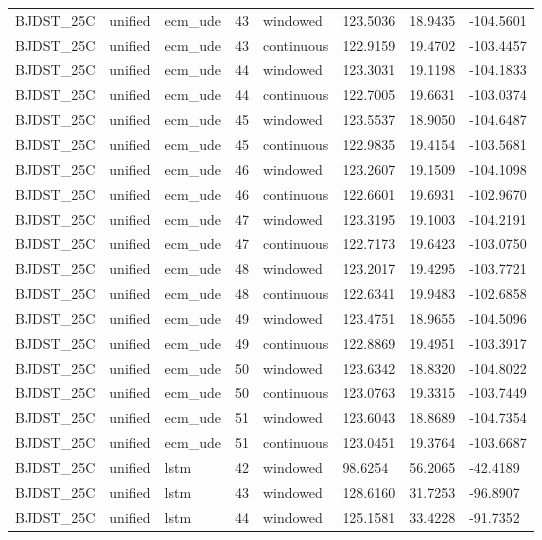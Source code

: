 \begin{tabular}{llllllll}
BJDST\_25C & unified & ecm\_ude & 43 & windowed & 123.5036 & 18.9435 & -104.5601 \\
BJDST\_25C & unified & ecm\_ude & 43 & continuous & 122.9159 & 19.4702 & -103.4457 \\
BJDST\_25C & unified & ecm\_ude & 44 & windowed & 123.3031 & 19.1198 & -104.1833 \\
BJDST\_25C & unified & ecm\_ude & 44 & continuous & 122.7005 & 19.6631 & -103.0374 \\
BJDST\_25C & unified & ecm\_ude & 45 & windowed & 123.5537 & 18.9050 & -104.6487 \\
BJDST\_25C & unified & ecm\_ude & 45 & continuous & 122.9835 & 19.4154 & -103.5681 \\
BJDST\_25C & unified & ecm\_ude & 46 & windowed & 123.2607 & 19.1509 & -104.1098 \\
BJDST\_25C & unified & ecm\_ude & 46 & continuous & 122.6601 & 19.6931 & -102.9670 \\
BJDST\_25C & unified & ecm\_ude & 47 & windowed & 123.3195 & 19.1003 & -104.2191 \\
BJDST\_25C & unified & ecm\_ude & 47 & continuous & 122.7173 & 19.6423 & -103.0750 \\
BJDST\_25C & unified & ecm\_ude & 48 & windowed & 123.2017 & 19.4295 & -103.7721 \\
BJDST\_25C & unified & ecm\_ude & 48 & continuous & 122.6341 & 19.9483 & -102.6858 \\
BJDST\_25C & unified & ecm\_ude & 49 & windowed & 123.4751 & 18.9655 & -104.5096 \\
BJDST\_25C & unified & ecm\_ude & 49 & continuous & 122.8869 & 19.4951 & -103.3917 \\
BJDST\_25C & unified & ecm\_ude & 50 & windowed & 123.6342 & 18.8320 & -104.8022 \\
BJDST\_25C & unified & ecm\_ude & 50 & continuous & 123.0763 & 19.3315 & -103.7449 \\
BJDST\_25C & unified & ecm\_ude & 51 & windowed & 123.6043 & 18.8689 & -104.7354 \\
BJDST\_25C & unified & ecm\_ude & 51 & continuous & 123.0451 & 19.3764 & -103.6687 \\
BJDST\_25C & unified & lstm & 42 & windowed & 98.6254 & 56.2065 & -42.4189 \\
BJDST\_25C & unified & lstm & 43 & windowed & 128.6160 & 31.7253 & -96.8907 \\
BJDST\_25C & unified & lstm & 44 & windowed & 125.1581 & 33.4228 & -91.7352 \\

\end{tabular}
